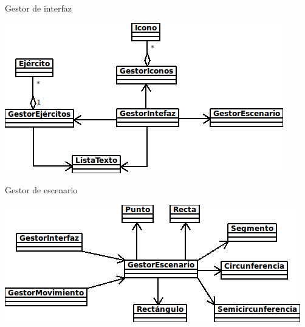 \documentclass[green, compress]{beamer}
\begin{document}
\begin{frame}{Gestor de interfaz}
\begin{center}
\includegraphics[scale=.8]{imagenes/Interfaz.png}
\end{center}
\end{frame}

\begin{frame}{Gestor de escenario}
\begin{center}
\includegraphics[scale=.8]{imagenes/Escenario.png}
\end{center}
\end{frame}
\end{document}
